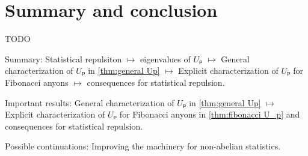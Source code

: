 
\chapter{Summary and conclusion}

TODO

Summary: Statistical repulsiton $↦$ eigenvalues of $Uₚ$ $↦$ General characterization of $Uₚ$ in \cref{thm:general Up} $↦$ Explicit characterization of $Uₚ$ for Fibonacci anyons $↦$ consequences for statistical repulsion.

Important results: General characterization of $Uₚ$ in \cref{thm:general Up} $↦$ Explicit characterization of $Uₚ$ for Fibonacci anyons in \cref{thm:fibonacci U_p} and consequences for statistical repulsion.

Possible continuations: Improving the machinery for non-abelian statistics.
